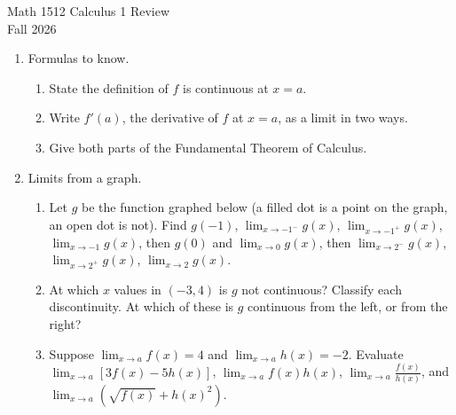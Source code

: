 \documentclass[12pt]{article}
\newcommand\parens[1]{\left( #1 \right)}
\begin{document}
\raggedright
\begin{center}
      {\large Math 1512 Calculus 1 Review}\\
  {Fall 2026}\\

\end{center}

\begin{enumerate}
\item[1.] Formulas to know.
\begin{enumerate}
\item[(a)] State the definition of $f$ is continuous at $x=a$.
\item[(b)] Write $f'(a)$, the derivative of $f$ at $x=a$, as a limit in two ways.
\item[(c)] Give both parts of the Fundamental Theorem of Calculus.
\end{enumerate}
\item[2.] Limits from a graph.
\begin{enumerate}
\item[(a)] Let $g$ be the function graphed below (a filled dot is a point on the graph, an open dot is not). Find $g(-1)$, $\lim_{x \to -1^-} g(x)$, $\lim_{x \to -1^+} g(x)$, $\lim_{x \to -1} g(x)$, then $g(0)$ and $\lim_{x \to 0} g(x)$, then $\lim_{x \to 2^-} g(x)$, $\lim_{x \to 2^+} g(x)$, $\lim_{x \to 2} g(x)$.
\begin{center}
\end{center}
\item[(b)] At which $x$ values in $(-3,4)$ is $g$ not continuous? Classify each discontinuity. At which of these is $g$ continuous from the left, or from the right?
\item[(c)] Suppose $\lim_{x \to a} f(x) = 4$ and $\lim_{x \to a} h(x) = -2$. Evaluate $\lim_{x \to a} [3f(x) - 5h(x)]$, $\lim_{x \to a} f(x)h(x)$, $\lim_{x \to a} \frac{f(x)}{h(x)}$, and $\lim_{x \to a} \parens{\sqrt{f(x)} + h(x)^2}$.

\end{enumerate}
\end{enumerate}
\end{document}
